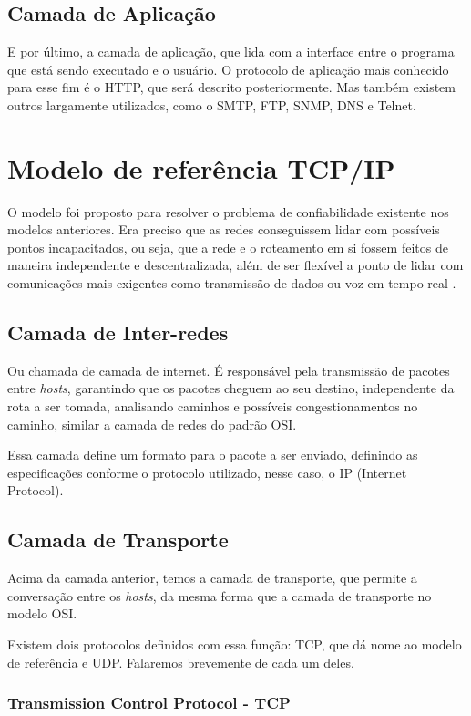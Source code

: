 \subsection{Camada de Aplicação}

E por último, a camada de aplicação, que lida com a interface entre o programa que está sendo executado e o usuário. O protocolo de aplicação mais conhecido para esse fim é o HTTP, que será descrito posteriormente. Mas também existem outros largamente utilizados, como o SMTP, FTP, SNMP, DNS e Telnet.

\section{Modelo de referência TCP/IP}
O modelo foi proposto para resolver o problema de confiabilidade existente nos modelos anteriores. Era preciso que as redes conseguissem lidar com possíveis pontos incapacitados, ou seja, que a rede e o roteamento em si fossem feitos de maneira independente e descentralizada, além de ser flexível a ponto de lidar com comunicações mais exigentes como transmissão de dados ou voz em tempo real
\cite{tanenbaumredes}.


\subsection{Camada de Inter-redes}
Ou chamada de camada de internet. É responsável pela transmissão de pacotes entre \textit{hosts}, garantindo que os pacotes cheguem ao seu destino, independente da rota a ser tomada, analisando caminhos e possíveis congestionamentos no caminho, similar a camada de redes do padrão OSI.

Essa camada define um formato para o pacote a ser enviado, definindo as especificações conforme o protocolo utilizado, nesse caso, o IP (Internet Protocol).


\subsection{Camada de Transporte}
Acima da camada anterior, temos a camada de transporte, que permite a conversação entre os \textit{hosts}, da mesma forma que a camada de transporte no modelo OSI.

Existem dois protocolos definidos com essa função: TCP, que dá nome ao modelo de referência e UDP. Falaremos brevemente de cada um deles.

\subsubsection{Transmission Control Protocol - TCP}

